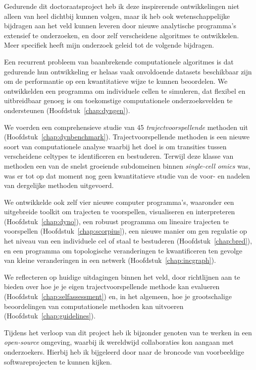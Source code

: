 Gedurende dit doctoraatsproject heb ik deze inspirerende ontwikkelingen niet alleen van heel dichtbij kunnen volgen, maar ik heb ook wetenschappelijke bijdragen aan het veld kunnen leveren door nieuwe analytische programma’s extensief te onderzoeken, en door zelf verscheidene algoritmes te ontwikkelen. Meer specifiek heeft mijn onderzoek geleid tot de volgende bijdragen.

Een recurrent probleem van baanbrekende computationele algoritmes is dat gedurende hun ontwikkeling er helaas vaak onvoldoende datasets beschikbaar zijn om de performantie op een kwantitatieve wijze te kunnen beoordelen. We ontwikkelden een programma om individuele cellen te simuleren, dat flexibel en uitbreidbaar genoeg is om toekomstige computationele onderzoeksvelden te ondersteunen (Hoofdstuk~\ref{chap:dyngen}).

We voerden een comprehensieve studie van 45 \textit{trajectvoorspellende} methoden uit (Hoofdstuk~\ref{chap:dynbenchmark}). Trajectvoorspellende methoden is een nieuwe soort van computationele analyse waarbij het doel is om transities tussen verscheidene celtypes te identificeren en bestuderen. Terwijl deze klasse van methoden een van de snelst groeiende subdomeinen binnen \textit{single-cell omics} was, was er tot op dat moment nog geen kwantitatieve studie van de voor- en nadelen van dergelijke methoden uitgevoerd.

We ontwikkelde ook zelf vier nieuwe computer programma's, waaronder een uitgebreide toolkit om trajecten te voorspellen, visualiseren en interpreteren (Hoofdstuk~\ref{chap:dyno}), een robuust programma om lineaire trajecten te voorspellen (Hoofdstuk~\ref{chap:scorpius}), een nieuwe manier om gen regulatie op het niveau van een individuele cel of staal te bestuderen (Hoofdstuk~\ref{chap:bred}), en een programma om topologische veranderingen te kwantificeren ten gevolge van kleine veranderingen in een netwerk (Hoofdstuk~\ref{chap:incgraph}). 

We reflecteren op huidige uitdagingen binnen het veld, door richtlijnen aan te bieden over hoe je je eigen trajectvoorspellende methode kan evalueren (Hoofdstuk~\ref{chap:selfassessment}) en, in het algemeen, hoe je grootschalige beoordelingen van computationele methoden kan uitvoeren (Hoofdstuk~\ref{chap:guidelines}).

Tijdens het verloop van dit project heb ik bijzonder genoten van te werken in een \textit{open-source} omgeving, waarbij ik wereldwijd collaboraties kon aangaan met onderzoekers. Hierbij heb ik bijgeleerd door naar de broncode van voorbeeldige softwareprojecten te kunnen kijken.
